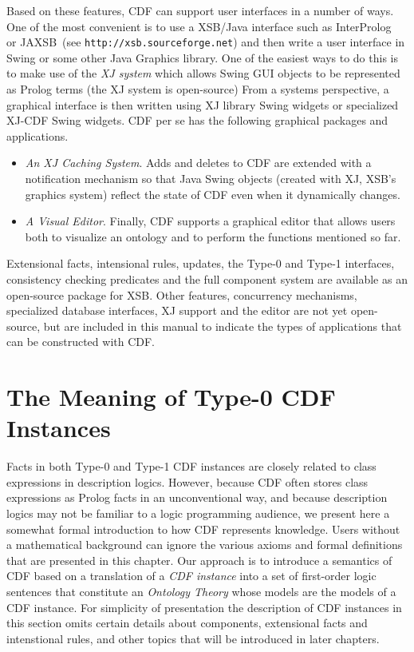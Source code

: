 Based on these features, CDF can support user interfaces in a number
of ways.  One of the most convenient is to use a XSB/Java interface
such as InterProlog~\cite{Cale01} or JAXSB~(see
\texttt{http://xsb.sourceforge.net}) and then write a user interface in
Swing or some other Java Graphics library.  One of the easiest ways to
do this is to make use of the {\em XJ system} which allows Swing GUI
objects to be represented as Prolog terms (the XJ system is
open-source) From a systems perspective, a graphical interface is then
written using XJ library Swing widgets or specialized XJ-CDF Swing widgets.
CDF per se has the following graphical packages and applications.
%
\begin{itemize}
%
\item {\em An XJ Caching System}. Adds and deletes to CDF are extended
with a notification mechanism so that Java Swing objects (created with
XJ, XSB's graphics system) reflect the state of CDF even when it
dynamically changes.
%
\item {\em A Visual Editor}. Finally,  CDF supports a graphical editor
that allows users both to visualize an ontology and to perform the
functions mentioned so far.
\end{itemize}
%
Extensional facts, intensional rules, updates, the Type-0 and Type-1
interfaces, consistency checking predicates and the full component
system are available as an open-source package for XSB.  Other
features, concurrency mechanisms, specialized database interfaces, XJ
support and the editor are not yet open-source, but are included in
this manual to indicate the types of applications that can be
constructed with CDF.

\section{The Meaning of Type-0 CDF Instances} \label{sec:type0} 

Facts in both Type-0 and Type-1 CDF instances are closely related to
class expressions in description logics.  However, because CDF often
stores class expressions as Prolog facts in an unconventional way, and
because description logics may not be familiar to a logic programming
audience, we present here a somewhat formal introduction to how CDF
represents knowledge.  Users without a mathematical background can
ignore the various axioms and formal definitions that are presented in
this chapter.  Our approach is to introduce a semantics of CDF based
on a translation of a {\em CDF instance} into a set of first-order
logic sentences that constitute an {\em Ontology Theory} whose models
are the models of a CDF instance.  For simplicity of presentation the
description of CDF instances in this section omits certain details
about components, extensional facts and intenstional rules, and other
topics that will be introduced in later chapters.

